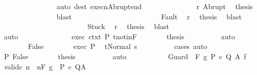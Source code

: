 \begin{isabellebody}
\ \ \ \ \ \ \ \ \ \ \ \ \ \ \isamarkupfalse%
\ {\isacharparenleft}auto\ dest{\isacharcolon}\ execn{\isacharunderscore}Abrupt{\isacharunderscore}end{\isacharparenright}\ \isanewline
\ \ \ \ \ \ \ \ \ \ \ \ \isamarkupfalse%
\ r\ Abrupt\ \isamarkupfalse%
\ {\isacharquery}thesis\isanewline
\ \ \ \ \ \ \ \ \ \ \ \ \ \ \isamarkupfalse%
\ blast\isanewline
\ \ \ \ \ \ \ \ \ \ \isamarkupfalse%
\isanewline
\ \ \ \ \ \ \ \ \ \ \ \ \isamarkupfalse%
\ Fault\ \isamarkupfalse%
\ r\ \isamarkupfalse%
\ {\isacharquery}thesis\ \isamarkupfalse%
\ blast\isanewline
\ \ \ \ \ \ \ \ \ \ \isamarkupfalse%
\isanewline
\ \ \ \ \ \ \ \ \ \ \ \ \isamarkupfalse%
\ Stuck\ \isamarkupfalse%
\ r\ \isamarkupfalse%
\ {\isacharquery}thesis\ \isamarkupfalse%
\ blast\isanewline
\ \ \ \ \ \ \ \ \ \ \isamarkupfalse%
\ \ \ \isanewline
\ \ \ \ \ \ \ \ \isamarkupfalse%
\ auto\isanewline
\ \ \ \ \ \ \isacommand{{\isacharbraceright}}\isamarkupfalse%
\isanewline
\ \ \ \ \ \ \isamarkupfalse%
\ exec\ ctxt\ P\ t{\isacharunderscore}notin{\isacharunderscore}F\isanewline
\ \ \ \ \ \ \isamarkupfalse%
\ {\isacharquery}thesis\isanewline
\ \ \ \ \ \ \ \ \isamarkupfalse%
\ auto\isanewline
\ \ \ \ \isamarkupfalse%
\isanewline
\ \ \ \ \ \ \isamarkupfalse%
\ False\isanewline
\ \ \ \ \ \ \isamarkupfalse%
\ exec\ P\ \isamarkupfalse%
\ {\isachardoublequoteopen}t{\isacharequal}Normal\ s{\isachardoublequoteclose}\isanewline
\ \ \ \ \ \ \ \ \isamarkupfalse%
\ cases\ auto\isanewline
\ \ \ \ \ \ \isamarkupfalse%
\ P\ False\isanewline
\ \ \ \ \ \ \isamarkupfalse%
\ {\isacharquery}thesis\isanewline
\ \ \ \ \ \ \ \ \isamarkupfalse%
\ auto\isanewline
\ \ \ \ \isamarkupfalse%
\isanewline
\ \ \isamarkupfalse%
\isanewline
{}\isamarkupfalse%
\isanewline
\ \ \isamarkupfalse%
\ {\isacharparenleft}Guard\ {\isasymTheta}\ F\ g\ P\ c\ Q\ A\ f{\isacharparenright}\isanewline
\ \ \isamarkupfalse%
\ valid{\isacharunderscore}c{\isacharcolon}\ {\isachardoublequoteopen}{\isasymAnd}n{\isachardot}\ {\isasymGamma}{\isacharcomma}{\isasymTheta}\ {\isasymTurnstile}n{\isacharcolon}\isactrlbsub {\isacharslash}F\isactrlesub \ {\isacharparenleft}g\ {\isasyminter}\ P{\isacharparenright}\ c\ Q{\isacharcomma}A{\isachardoublequoteclose}\ \isamarkupfalse%

\end{isabellebody}
